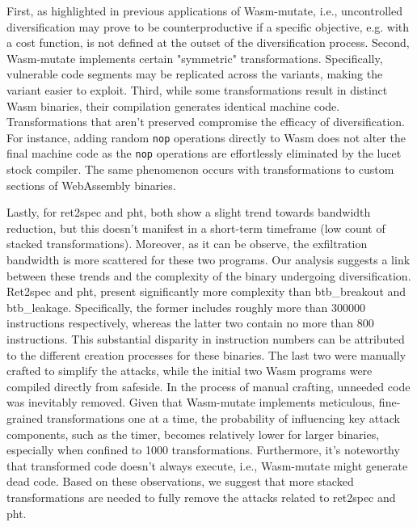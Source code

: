 \documentclass[sigplan,screen]{acmart}
\newcommand{\tool}{Wasm-mutate\xspace}
\newcommand{\wasm}{Wasm\xspace}
\newcommand{\Wasm}{WebAssembly\xspace}
\begin{document}
First, as highlighted in previous applications of \tool \cite{CABRERAARTEAGA2023103296}, i.e., uncontrolled diversification may prove to be counterproductive if a specific objective, e.g. with a cost function, is not defined at the outset of the diversification process.
Second, \tool implements certain "symmetric" transformations. 
Specifically, vulnerable code segments may be replicated across the variants, making the variant easier to exploit.
Third, while some transformations result in distinct \wasm binaries, their compilation generates identical machine code. 
Transformations that aren't preserved compromise the efficacy of diversification. 
For instance, adding random \texttt{nop} operations directly to \wasm does not alter the final machine code as the \texttt{nop} operations are effortlessly eliminated by the lucet stock compiler.
The same phenomenon occurs with transformations to custom sections of \Wasm binaries.


Lastly, for ret2spec and pht, both show a slight trend towards bandwidth reduction, but this doesn't manifest in a short-term timeframe (low count of stacked transformations).
Moreover, as it can be observe, the exfiltration bandwidth is more scattered for these two programs.
Our analysis suggests a link between these trends and the complexity of the binary undergoing diversification. 
Ret2spec and pht, present significantly more complexity than btb\_breakout and btb\_leakage. 
Specifically, the former includes roughly more than 300000 instructions respectively, whereas the latter two contain no more than 800 instructions.
This substantial disparity in instruction numbers can be attributed to the different creation processes for these binaries. 
The last two were manually crafted to simplify the attacks, while the initial two \wasm programs were compiled directly from safeside. 
In the process of manual crafting, unneeded code was inevitably removed.
Given that \tool implements meticulous, fine-grained transformations one at a time, the probability of influencing key attack components, such as the timer, becomes relatively lower for larger binaries, especially when confined to 1000 transformations. 
Furthermore, it's noteworthy that transformed code doesn't always execute, i.e., \tool might generate dead code.
Based on these observations, we suggest that more  stacked transformations are needed to fully remove the attacks related to ret2spec and pht.
\end{document}
